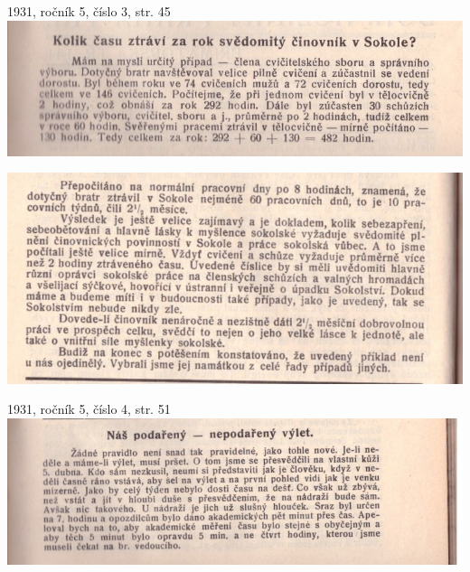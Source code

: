 \documentclass[11pt]{article}
\begin{document}
\clearpage

1931, ročník 5, číslo 3, str. 45 \\
\includegraphics[width=\imagewidth]{original/1931/Skener_20250315 (2).jpg}

\includegraphics[width=\imagewidth]{original/1931/Skener_20250315 (3).jpg}

1931, ročník 5, číslo 4, str. 51 \\
\includegraphics[width=\imagewidth]{original/1931/Skener_20250315 (8).jpg}
\end{document}

